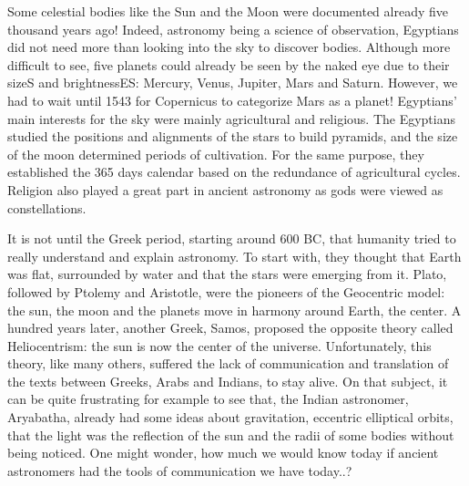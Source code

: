 



Some celestial bodies like the Sun and the Moon were documented already five thousand years ago! Indeed, astronomy being a science of observation, Egyptians did not need more than looking into the sky to discover bodies. Although more difficult to see, five planets could already be seen by the naked eye due to their sizeS and brightnessES: Mercury, Venus, Jupiter, Mars and Saturn. However, we had to wait until 1543 for Copernicus to categorize Mars as a planet! Egyptians' main interests for the sky were mainly agricultural and religious. The Egyptians studied the positions and alignments of the stars to build pyramids, and the size of the moon determined periods of cultivation. For the same purpose, they established the 365 days calendar based on the redundance of agricultural cycles. Religion also played a great part in ancient astronomy as gods were viewed as constellations. 


It is not until the Greek period, starting around 600 BC, that humanity tried to really understand and explain astronomy. To start with, they thought that Earth was flat, surrounded by water and that the stars were emerging from it. Plato, followed by Ptolemy and Aristotle, were the pioneers of the Geocentric model: the sun, the moon and the planets move in harmony around Earth, the center. A hundred years later, another Greek, Samos, proposed the opposite theory called Heliocentrism: the sun is now the center of the universe. Unfortunately, this theory, like many others, suffered the lack of communication and translation of the texts between Greeks, Arabs and Indians, to stay alive. On that subject, it can be quite frustrating for example to see that, the Indian astronomer, Aryabatha, already had some ideas about gravitation, eccentric elliptical orbits, that the light was the reflection of the sun and the radii of some bodies without being noticed. One might wonder, how much we would know today if ancient astronomers had the tools of communication we have today..? \\



